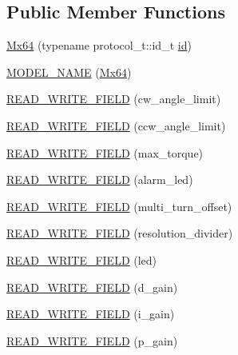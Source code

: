 \subsection*{Public Member Functions}
\begin{DoxyCompactItemize}
\item 
\hyperlink{classdynamixel_1_1servos_1_1_mx64_a49507677ecbba67afab92b28b8d5d888}{Mx64} (typename protocol\+\_\+t\+::id\+\_\+t \hyperlink{classdynamixel_1_1servos_1_1_servo_a2d022081672e25a7bb57b76706e1cc57}{id})
\item 
\hyperlink{classdynamixel_1_1servos_1_1_mx64_a8e4850f873f219a6bd992e00ed2b2893}{M\+O\+D\+E\+L\+\_\+\+N\+A\+ME} (\hyperlink{classdynamixel_1_1servos_1_1_mx64}{Mx64})
\item 
\hyperlink{classdynamixel_1_1servos_1_1_mx64_a915d90284393a5556dd447016a450aec}{R\+E\+A\+D\+\_\+\+W\+R\+I\+T\+E\+\_\+\+F\+I\+E\+LD} (cw\+\_\+angle\+\_\+limit)
\item 
\hyperlink{classdynamixel_1_1servos_1_1_mx64_a06bccfc8cf925e643716d221bab61c6b}{R\+E\+A\+D\+\_\+\+W\+R\+I\+T\+E\+\_\+\+F\+I\+E\+LD} (ccw\+\_\+angle\+\_\+limit)
\item 
\hyperlink{classdynamixel_1_1servos_1_1_mx64_a7dd54fe3e408cd1350c16d828cd60372}{R\+E\+A\+D\+\_\+\+W\+R\+I\+T\+E\+\_\+\+F\+I\+E\+LD} (max\+\_\+torque)
\item 
\hyperlink{classdynamixel_1_1servos_1_1_mx64_aba4a199be610791462aadde44525f6c1}{R\+E\+A\+D\+\_\+\+W\+R\+I\+T\+E\+\_\+\+F\+I\+E\+LD} (alarm\+\_\+led)
\item 
\hyperlink{classdynamixel_1_1servos_1_1_mx64_a3b2d28d4266c3b36a5fd5c0477dcfbcb}{R\+E\+A\+D\+\_\+\+W\+R\+I\+T\+E\+\_\+\+F\+I\+E\+LD} (multi\+\_\+turn\+\_\+offset)
\item 
\hyperlink{classdynamixel_1_1servos_1_1_mx64_abb36dda686dc6d22863b80f2a7479c7a}{R\+E\+A\+D\+\_\+\+W\+R\+I\+T\+E\+\_\+\+F\+I\+E\+LD} (resolution\+\_\+divider)
\item 
\hyperlink{classdynamixel_1_1servos_1_1_mx64_a77230a7c22b236092ee03f150649f0fa}{R\+E\+A\+D\+\_\+\+W\+R\+I\+T\+E\+\_\+\+F\+I\+E\+LD} (led)
\item 
\hyperlink{classdynamixel_1_1servos_1_1_mx64_aa6f608604d7dbdfeb6502c76bfa676cc}{R\+E\+A\+D\+\_\+\+W\+R\+I\+T\+E\+\_\+\+F\+I\+E\+LD} (d\+\_\+gain)
\item 
\hyperlink{classdynamixel_1_1servos_1_1_mx64_ab9d917e4504776a034c072e352222faa}{R\+E\+A\+D\+\_\+\+W\+R\+I\+T\+E\+\_\+\+F\+I\+E\+LD} (i\+\_\+gain)
\item 
\hyperlink{classdynamixel_1_1servos_1_1_mx64_aad0f200e1baa38d7cf01dfc7f15eec84}{R\+E\+A\+D\+\_\+\+W\+R\+I\+T\+E\+\_\+\+F\+I\+E\+LD} (p\+\_\+gain)

\end{DoxyCompactItemize}
